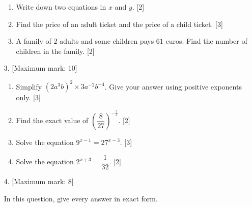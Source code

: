 \documentclass[12pt, twoside]{article}
\begin{document}
\begin{enumerate}[itemsep=0.15cm]
\begin{enumerate}[itemsep=0.1cm]
  \item Write down two equations in $x$ and $y$. \hfill [2]
  \item Find the price of an adult ticket and the price of a child ticket.
  \hfill [3]
  \item A family of $2$ adults and some children pays $61$ euros. Find
  the number of children in the family. \hfill [2]
\end{enumerate}


\newpage

\item[3.] [Maximum mark: 10]

\begin{enumerate}[itemsep=0.1cm]
  \item Simplify $\left(2a^{3}b\right)^{2} \times 3a^{-2}b^{-4}$. Give your
  answer using positive exponents only. \hfill [3]
  \item Find the exact value of $\left(\dfrac{8}{27}\right)^{-\frac{2}{3}}$.
  \hfill [2]
  \item Solve the equation $9^{x - 1} = 27^{x - 3}$. \hfill [3]
  \item Solve the equation $2^{x + 3} = \dfrac{1}{32}$. \hfill [2]
\end{enumerate}


\newpage

\item[4.] [Maximum mark: 8]

In this question, give every answer in exact form.


\end{enumerate}
\end{document}

